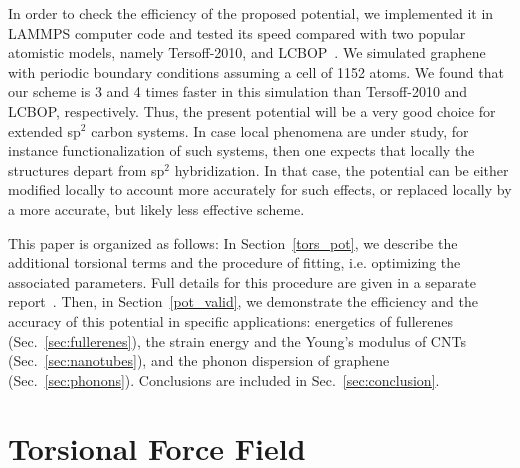 \documentclass[aps,prb,floatfix,twocolumn,showpacs]{revtex4}
\begin{document}
In order to check the efficiency of the proposed potential, we implemented it in 
LAMMPS computer code\cite{lammps_paper,lammps} 
and tested its speed compared with two popular atomistic models, namely 
Tersoff-2010\cite{T2010}, and LCBOP~\cite{LCBOP}. 
We simulated graphene with periodic boundary conditions assuming a cell of 1152 atoms. 
We found that our scheme is 3 and 4 times faster in this simulation than  Tersoff-2010 and  
LCBOP, respectively. Thus, the present potential will be a very good choice for extended sp$^2$ carbon systems. In case local phenomena are under study, for instance functionalization of such systems, then one expects that locally the structures depart from  sp$^2$ hybridization. In that case, the potential can be either modified locally to account more accurately for such effects, or replaced locally by a more accurate, but likely less effective scheme. 

This paper is organized as follows: In Section~\ref{tors_pot}, we describe the additional torsional terms
and the procedure of fitting, i.e. optimizing the associated parameters. Full details for
this procedure are given in a separate report~\cite{torsional_p}. Then, in Section~\ref{pot_valid}, we 
demonstrate the efficiency and the accuracy of this potential in specific applications:
energetics of fullerenes (Sec.~\ref{sec:fullerenes}),
the strain energy and the Young's modulus of CNTs (Sec.~\ref{sec:nanotubes}),
and the phonon dispersion of graphene (Sec.~\ref{sec:phonons}).
Conclusions are included in Sec.~\ref{sec:conclusion}.


\section{Torsional Force Field\label{tors_pot}}
\end{document}
